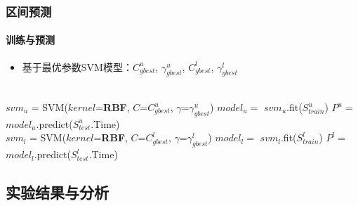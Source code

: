 \begin{frame}
\frametitle{区间预测}
\framesubtitle{训练与预测}
\begin{itemize}
    \item 基于最优参数SVM模型：$C^u_{gbest}$, $\gamma^u_{gbest}$, $C^l_{gbest}$, $\gamma^l_{gbest}$
\end{itemize}
\begin{algorithmic}[1]
    \\
    \State $svm_u$ = SVM($kernel$=\textbf{RBF}, $C$=$C^u_{gbest}$, $\gamma$=$\gamma^u_{gbest}$)
    \State $model_u =$ $svm_u$.fit($S^u_{train}$) 
    \State $P^u =$ $model_u$.predict($S^u_{test}$.Time) 
    \\
    \State $svm_l$ = SVM($kernel$=\textbf{RBF}, $C$=$C^l_{gbest}$, $\gamma$=$\gamma^l_{gbest}$)
    \State $model_l =$ $svm_l$.fit($S^l_{train}$) 
    \State $P^l =$ $model_l$.predict($S^l_{test}$.Time) \\
\end{algorithmic}
\end{frame}

\subsection{实验结果与分析}

